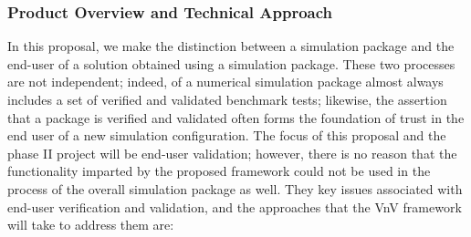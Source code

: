 \subsubsection{Product Overview and Technical Approach}

In this proposal, we make the distinction between \VV a simulation package and the end-user \VV of a solution obtained using a simulation package. These two processes are not independent; indeed, \VV of a numerical simulation 
package almost always includes a set of verified and validated benchmark tests; likewise, the assertion that a package is verified and validated often forms the foundation of trust in the end user \VV of a new simulation configuration. The focus of this proposal and the phase II project will be end-user validation; however, there is no reason that the functionality imparted by the proposed framework could not be used in the \VV process of the overall simulation package as well. They key issues associated with end-user verification and validation, and the approaches that the VnV framework will take to address them are:

